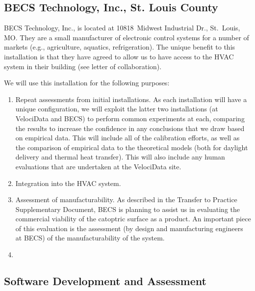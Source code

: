 \subsection{BECS Technology, Inc., St. Louis County}

BECS Technology, Inc., is located at
10818~Midwest Industrial Dr., St.~Louis, MO.
They are a small manufacturer of electronic control
systems for a number of markets (e.g., agriculture, aquatics, refrigeration).
The unique benefit to this installation is that they have agreed to
allow us to have access to the HVAC system in their building (see letter
of collaboration).


We will use this installation for the following purposes:

\begin{enumerate}

\item Repeat assessments from initial installations.
As each installation will have a unique configuration, we will exploit the
latter two installations (at VelociData and BECS) to perform common
experiments at each, comparing the results to increase the confidence
in any conclusions that we draw based on empirical data.
This will include all of the calibration efforts, as well as the comparison
of empirical data to the theoretical models (both for daylight delivery
and thermal heat transfer).
This will also include any human evaluations that are undertaken at
the VelociData site.

\item Integration into the HVAC system.

\item Assessment of manufacturability.
As described in the Transfer to Practice Supplementary Document, BECS
is planning to assist us in evaluating the commercial viability of the
catoptric surface as a product.  An important piece of this evaluation is
the assessment (by design and manufacturing engineers at BECS) of the
manufacturability of the system.

\item {}

\end{enumerate}

\subsection{Software Development and Assessment}

